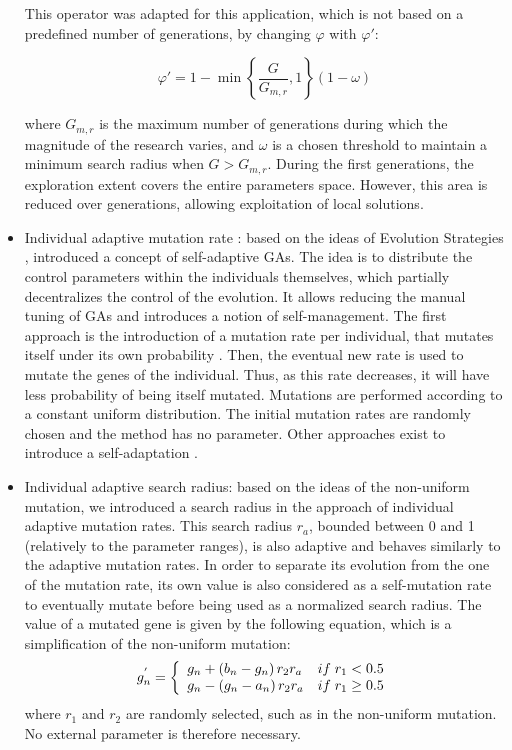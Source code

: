\documentclass{ametsoc}
\begin{document}
\begin{itemize}
	This operator was adapted for this application, which is not based on a predefined number of generations, by changing $\varphi$ with $\varphi'$:
	
	\begin{equation}
	\varphi' = 1 - \min \left\lbrace \dfrac{G}{G_{m,r}}, 1 \right\rbrace \left(1-\omega\right)
	\end{equation}
	
	where $G_{m,r}$ is the maximum number of generations during which the magnitude of the research varies, and $\omega$ is a chosen threshold to maintain a minimum search radius when $G>G_{m,r}$. During the first generations, the exploration extent covers the entire parameters space. However, this area is reduced over generations, allowing exploitation of local solutions.
	
	\item Individual adaptive mutation rate \citep{Back1992a}: based on the ideas of Evolution Strategies \citep[see][]{Rechenberg1973, Schwefel1981}, \citet{Back1992a} introduced a concept of self-adaptive GAs. The idea is to distribute the control parameters within the individuals themselves, which partially decentralizes the control of the evolution. It allows reducing the manual tuning of GAs and introduces a notion of self-management. The first approach is the introduction of a mutation rate per individual, that mutates itself under its own probability \citep{Back1992a}. Then, the eventual new rate is used to mutate the genes of the individual. Thus, as this rate decreases, it will have less probability of being itself mutated. Mutations are performed according to a constant uniform distribution. The initial mutation rates are randomly chosen \citep{Back1992a} and the method has no parameter. Other approaches exist to introduce a self-adaptation \citep[see][]{Smith1997a, Deb1999, Deb2001a}.
	
	\item Individual adaptive search radius: based on the ideas of the non-uniform mutation, we introduced a search radius in the approach of individual adaptive mutation rates. This search radius $r_{a}$, bounded between 0 and 1 (relatively to the parameter ranges), is also adaptive and behaves similarly to the adaptive mutation rates. In order to separate its evolution from the one of the mutation rate, its own value is also considered as a self-mutation rate to eventually mutate before being used as a normalized search radius. The value of a mutated gene is given by the following equation, which is a simplification of the non-uniform mutation:
	\begin{equation}
	g_{n}^{'} = 
	\left\lbrace \begin{array}{l l} 
	g_{n} + \left(b_{n}-g_{n}\right) r_{2} r_{a} & if \; r_{1} < 0.5 \\
	g_{n} - \left(g_{n}-a_{n}\right) r_{2} r_{a} & if \; r_{1} \geq 0.5 \\
	\end{array} \right.
	\label{eq:adaptive_search_radius_mutation}
	\end{equation}
	where $r_{1}$ and $r_{2}$ are randomly selected, such as in the non-uniform mutation. No external parameter is therefore necessary.
	

\end{itemize}
\end{document}
